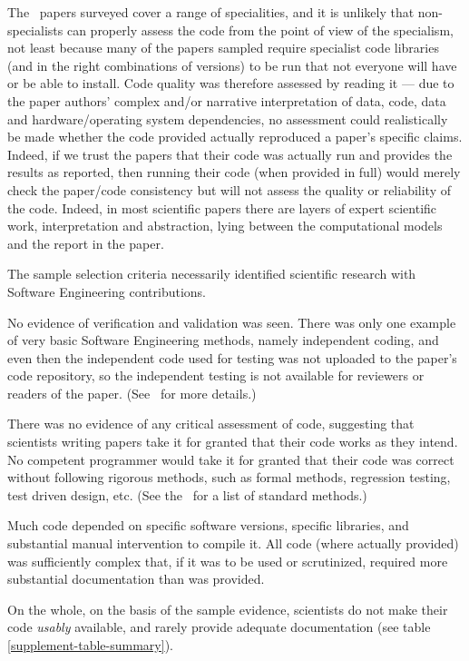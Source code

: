 \documentclass[10pt,a4paper]{article}
\begin{document}
The \the\dataN\ papers surveyed cover a range of specialities, and it is unlikely that non-specialists can properly assess the code from the point of view of the specialism, not least because many of the papers sampled require specialist code libraries (and in the right combinations of versions) to be run that not everyone will have or be able to install. Code quality was therefore assessed by reading it --- due to the paper authors' complex and/or narrative interpretation of data, code, data and hardware/operating system dependencies, no assessment could realistically be made whether the code provided actually reproduced a paper's specific claims. Indeed, if we trust the papers that their code was actually run and provides the results as reported, then running their code (when provided in full) would merely check the paper/code consistency but will not assess the quality or reliability of the code. Indeed, in most scientific papers there are layers of expert scientific work, interpretation and abstraction, lying between the computational models and the report in the paper.

\label{summary-of-results}
The sample selection criteria necessarily identified scientific research with Software Engineering contributions. 

No evidence of verification and validation was seen. There was only one example of very basic Software Engineering methods, namely independent coding, and even then the independent code used for testing was not uploaded to the paper's code repository, so the independent testing is not available for reviewers or readers of the paper. (See \supplement\ for more details.)

There was no evidence of any critical assessment of code, suggesting that scientists writing papers take it for granted that their code works as they intend. No competent programmer would take it for granted that their code was correct without following rigorous methods, such as formal methods, regression testing, test driven design, etc. (See the \supplement\ for a list of standard methods.)

Much code depended on specific software versions, specific libraries, and substantial manual intervention to compile it. All code (where actually provided) was sufficiently complex that, if it was to be used or scrutinized, required more substantial documentation than was provided.

On the whole, on the basis of the sample evidence, scientists do not make their code \emph{usably\/} available, and rarely provide adequate documentation (see table \ref{supplement-table-summary}). 
\end{document}
